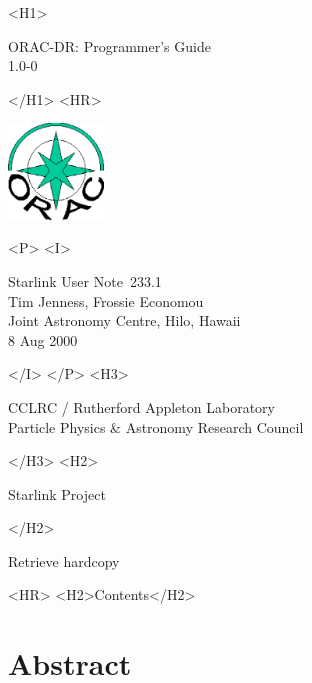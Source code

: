 \documentclass[twoside,11pt]{article}
\newcommand{\stardoccategory}  {Starlink User Note}
\newcommand{\stardocsource}    {sun\stardocnumber}
\newcommand{\stardocnumber}    {233.1}
\newcommand{\stardocauthors}   {Tim Jenness, Frossie Economou\\
Joint Astronomy Centre, Hilo, Hawaii}
\newcommand{\stardocdate}      {8 Aug 2000}
\newcommand{\stardoctitle}     {ORAC-DR: Programmer's Guide}
\newcommand{\stardocversion}   {1.0-0}
\newcommand{\stardocmanual}    {}
\newcommand{\htmladdnormallink}[2]{#1}
\newcommand{\htmladdimg}[1]{}
\newcommand{\htmlref}[2]{#1}
\newcommand{\htmladdtonavigation}[1]{}
\newcommand{\xlabel}[1]{}
\renewcommand{\_}{\texttt{\symbol{95}}}
\begin{document}
\begin{htmlonly}
   \xlabel{}
   \begin{rawhtml} <H1> \end{rawhtml}
      \stardoctitle\\
      \stardocversion\\
      \stardocmanual
   \begin{rawhtml} </H1> <HR> \end{rawhtml}

\includegraphics[width=1.0in]{sun233_logo.eps}

   \begin{rawhtml} <P> <I> \end{rawhtml}
   \stardoccategory\ \stardocnumber \\
   \stardocauthors \\
   \stardocdate
   \begin{rawhtml} </I> </P> <H3> \end{rawhtml}
      \htmladdnormallink{CCLRC / Rutherford Appleton Laboratory}
                        {http://www.cclrc.ac.uk} \\
      \htmladdnormallink{Particle Physics \& Astronomy Research Council}
                        {http://www.pparc.ac.uk} \\
   \begin{rawhtml} </H3> <H2> \end{rawhtml}
      \htmladdnormallink{Starlink Project}{http://www.starlink.rl.ac.uk/}
   \begin{rawhtml} </H2> \end{rawhtml}
   \htmladdnormallink{\htmladdimg{source.gif} Retrieve hardcopy}
      {http://www.starlink.rl.ac.uk/cgi-bin/hcserver?\stardocsource}\\

  \label{stardoccontents}
  \begin{rawhtml} 
    <HR>
    <H2>Contents</H2>
  \end{rawhtml}
  \htmladdtonavigation{\htmlref{\htmladdimg{contents_motif.gif}}
        {stardoccontents}}

  \section{\xlabel{abstract}Abstract}
\end{htmlonly}
\end{document}
